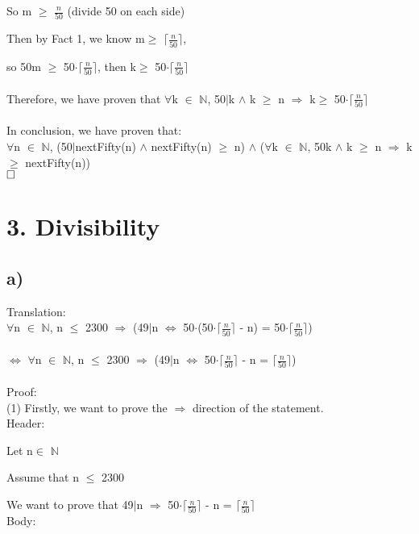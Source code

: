 \documentclass[12pt]{article}
\begin{document}
So m $\geq$ $\frac{n}{50}$ (divide 50 on each side)

Then by Fact 1, we know m$\geq$ $\lceil$$\frac{n}{50}$$\rceil$,

so 50m $\geq$ 50$\cdot$$\lceil$$\frac{n}{50}$$\rceil$, then k$\geq$ 50$\cdot$$\lceil$$\frac{n}{50}$$\rceil$ \\
~\\
Therefore, we have proven that $\forall$k $\in$ $\mathbb{N}$, 50$\mid$k $\wedge$ k $\geq$ n $\Rightarrow$ k$\geq$ 50$\cdot$$\lceil$$\frac{n}{50}$$\rceil$ \\
~\\
In conclusion, we have proven that:\\
$\forall$n $\in$ $\mathbb{N}$, (50$\mid$nextFifty(n) $\wedge$ nextFifty(n) $\geq$ n) $\wedge$ ($\forall$k $\in$ $\mathbb{N}$, 50\textbar k $\wedge$ k $\geq$ n $\Rightarrow$ k $\geq$ nextFifty(n)) \\

$\hfill\square$

\newpage



\section*{3. Divisibility}
\subsection*{a)}

Translation: \\
$\forall$n $\in$ $\mathbb{N}$, n $\leq$ 2300 $\Rightarrow$ (49$\mid$n $\Leftrightarrow$  50$\cdot$(50$\cdot$$\lceil$$\frac{n}{50}$$\rceil$ - n) = 50$\cdot$$\lceil$$\frac{n}{50}$$\rceil$) \\
~\\
$\Leftrightarrow$ $\forall$n $\in$ $\mathbb{N}$, n $\leq$ 2300 $\Rightarrow$ (49$\mid$n $\Leftrightarrow$  50$\cdot$$\lceil$$\frac{n}{50}$$\rceil$ - n = $\lceil$$\frac{n}{50}$$\rceil$) \\
~\\
Proof: \\
(1) Firstly, we want to prove the $\Rightarrow$ direction of the statement. \\
Header: 

Let n$\in$ $\mathbb{N}$

Assume that n $\leq$ 2300

We want to prove that 49$\mid$n $\Rightarrow$  50$\cdot$$\lceil$$\frac{n}{50}$$\rceil$ - n = $\lceil$$\frac{n}{50}$$\rceil$ \\
Body:
\end{document}
